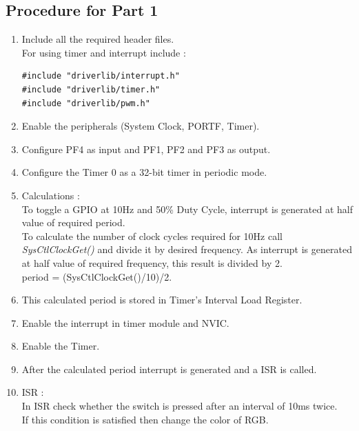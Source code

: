 \documentclass[a4paper,12pt,oneside]{book}
\begin{document}
\subsection{Procedure for Part 1}
\begin{enumerate}
\item Include all the required header files.\\
For using timer and interrupt include :
\begin{lstlisting}
#include "driverlib/interrupt.h"
#include "driverlib/timer.h"
#include "driverlib/pwm.h"
\end{lstlisting}
\item Enable the peripherals (System Clock, PORTF, Timer).
\item Configure PF4 as input and PF1, PF2 and PF3 as output. 
\item Configure the Timer 0 as a 32-bit timer in periodic mode.
\item Calculations :\\
To toggle a GPIO at 10Hz and 50\% Duty Cycle, interrupt is generated at half value of required period.\\
To calculate the number of clock cycles required for 10Hz call \textit{SysCtlClockGet()} and divide it by desired frequency. As interrupt is generated at half value of required frequency, this result is divided by 2. \\
period = (SysCtlClockGet()/10)/2.
\item This calculated period is stored in Timer's Interval Load Register.
\item Enable the interrupt in timer module and NVIC.
\item Enable the Timer.
\item After the calculated period interrupt is generated and a ISR is called.
\item ISR : \\
In ISR check whether the switch is pressed after an interval of 10ms twice.\\
If this condition is satisfied then change the color of RGB.
\end{enumerate}
\end{document}
